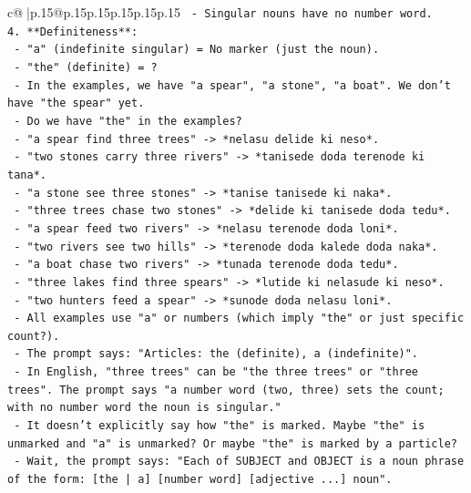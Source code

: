 \documentclass{article}
\begin{document}
{\begin{supertabular}{c@{$\;$}|p{.15\linewidth}@{}p{.15\linewidth}p{.15\linewidth}p{.15\linewidth}p{.15\linewidth}p{.15\linewidth}}
{{{\texttt{    {-} Singular nouns have no number word.} \\
\texttt{4.  **Definiteness**:} \\
\texttt{    {-} "a" (indefinite singular) = No marker (just the noun).} \\
\texttt{    {-} "the" (definite) = ?} \\
\texttt{    {-} In the examples, we have "a spear", "a stone", "a boat". We don't have "the spear" yet.} \\
\texttt{    {-} Do we have "the" in the examples?} \\
\texttt{      {-} "a spear find three trees" {-}> *nelasu delide ki neso*.} \\
\texttt{      {-} "two stones carry three rivers" {-}> *tanisede doda terenode ki tana*.} \\
\texttt{      {-} "a stone see three stones" {-}> *tanise tanisede ki naka*.} \\
\texttt{      {-} "three trees chase two stones" {-}> *delide ki tanisede doda tedu*.} \\
\texttt{      {-} "a spear feed two rivers" {-}> *nelasu terenode doda loni*.} \\
\texttt{      {-} "two rivers see two hills" {-}> *terenode doda kalede doda naka*.} \\
\texttt{      {-} "a boat chase two rivers" {-}> *tunada terenode doda tedu*.} \\
\texttt{      {-} "three lakes find three spears" {-}> *lutide ki nelasude ki neso*.} \\
\texttt{      {-} "two hunters feed a spear" {-}> *sunode doda nelasu loni*.} \\
\texttt{    {-} All examples use "a" or numbers (which imply "the" or just specific count?).} \\
\texttt{    {-} The prompt says: "Articles: the (definite), a (indefinite)".} \\
\texttt{    {-} In English, "three trees" can be "the three trees" or "three trees". The prompt says "a number word (two, three) sets the count; with no number word the noun is singular."} \\
\texttt{    {-} It doesn't explicitly say how "the" is marked. Maybe "the" is unmarked and "a" is unmarked? Or maybe "the" is marked by a particle?} \\
\texttt{    {-} Wait, the prompt says: "Each of SUBJECT and OBJECT is a noun phrase of the form: {[}the | a{]} {[}number word{]} {[}adjective ...{]} noun".} \\
}}}
\end{supertabular}}
\end{document}
